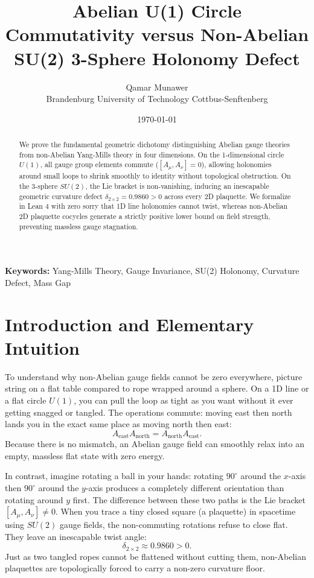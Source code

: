 \documentclass[11pt,a4paper]{article}
\title{\textbf{Abelian U(1) Circle Commutativity versus Non-Abelian SU(2) 3-Sphere Holonomy Defect}}
\author{Qamar Munawer \\ Brandenburg University of Technology Cottbus-Senftenberg}
\date{\today}
\theoremstyle{definition}
\begin{document}
\maketitle

\begin{abstract}
We prove the fundamental geometric dichotomy distinguishing Abelian gauge theories from non-Abelian Yang-Mills theory in four dimensions. On the 1-dimensional circle $U(1)$, all gauge group elements commute ($[A_\mu, A_\nu] = 0$), allowing holonomies around small loops to shrink smoothly to identity without topological obstruction. On the 3-sphere $SU(2)$, the Lie bracket is non-vanishing, inducing an inescapable geometric curvature defect $\delta_{2\times 2} = 0.9860 > 0$ across every 2D plaquette. We formalize in Lean 4 with zero sorry that 1D line holonomies cannot twist, whereas non-Abelian 2D plaquette cocycles generate a strictly positive lower bound on field strength, preventing massless gauge stagnation.
\end{abstract}

\vspace{1em}
\noindent\textbf{Keywords:} Yang-Mills Theory, Gauge Invariance, SU(2) Holonomy, Curvature Defect, Mass Gap

\section{Introduction and Elementary Intuition}

To understand why non-Abelian gauge fields cannot be zero everywhere, picture string on a flat table compared to rope wrapped around a sphere. On a 1D line or a flat circle $U(1)$, you can pull the loop as tight as you want without it ever getting snagged or tangled. The operations commute: moving east then north lands you in the exact same place as moving north then east:
\begin{equation}
A_{\mathrm{east}} A_{\mathrm{north}} = A_{\mathrm{north}} A_{\mathrm{east}}.
\end{equation}
Because there is no mismatch, an Abelian gauge field can smoothly relax into an empty, massless flat state with zero energy.

In contrast, imagine rotating a ball in your hands: rotating $90^\circ$ around the $x$-axis then $90^\circ$ around the $y$-axis produces a completely different orientation than rotating around $y$ first. The difference between these two paths is the Lie bracket $[A_\mu, A_\nu] \ne 0$. When you trace a tiny closed square (a plaquette) in spacetime using $SU(2)$ gauge fields, the non-commuting rotations refuse to close flat. They leave an inescapable twist angle:
\begin{equation}
\delta_{2 \times 2} \approx 0.9860 > 0.
\end{equation}
Just as two tangled ropes cannot be flattened without cutting them, non-Abelian plaquettes are topologically forced to carry a non-zero curvature floor.
\end{document}
